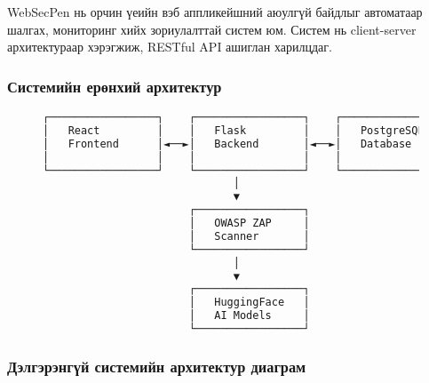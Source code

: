 \documentclass[main.tex]{subfiles}
\begin{document}
WebSecPen нь орчин үеийн вэб аппликейшний аюулгүй байдлыг автоматаар шалгах, мониторинг хийх зориулалттай систем юм. Систем нь client-server архитектураар хэрэгжиж, RESTful API ашиглан харилцдаг.

\subsubsection{Системийн ерөнхий архитектур}

\begin{figure}[h]
\centering
\begin{lstlisting}[language=bash, caption=Системийн архитектурын бүрэлдэхүүн]
┌─────────────────┐    ┌─────────────────┐    ┌─────────────────┐
│   React         │    │   Flask         │    │   PostgreSQL    │
│   Frontend      │◄──►│   Backend       │◄──►│   Database      │
│                 │    │                 │    │                 │
└─────────────────┘    └─────────────────┘    └─────────────────┘
                              │
                              ▼
                       ┌─────────────────┐
                       │   OWASP ZAP     │
                       │   Scanner       │
                       └─────────────────┘
                              │
                              ▼
                       ┌─────────────────┐
                       │   HuggingFace   │
                       │   AI Models     │
                       └─────────────────┘
\end{lstlisting}
\end{figure}

\subsubsection{Дэлгэрэнгүй системийн архитектур диаграм}
\end{document}
